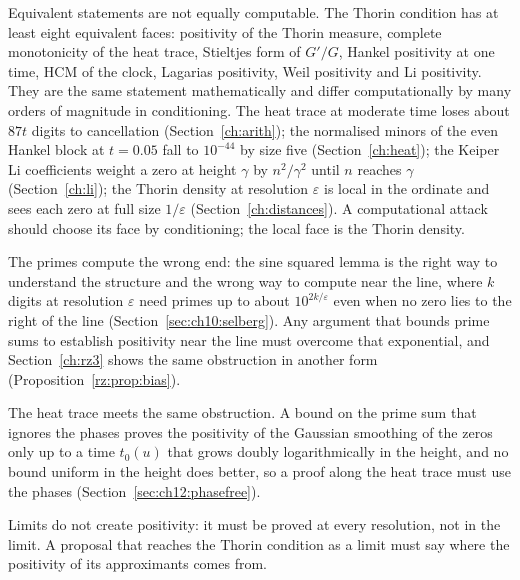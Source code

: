 Equivalent statements are not equally computable. The Thorin condition has at least eight equivalent faces: positivity of the Thorin measure, complete monotonicity of the heat trace, Stieltjes form of $G'/G$, Hankel positivity at one time, HCM of the clock, Lagarias positivity, Weil positivity and Li positivity. They are the same statement mathematically and differ computationally by many orders of magnitude in conditioning. The heat trace at moderate time loses about $87t$ digits to cancellation (Section~\ref{ch:arith}); the normalised minors of the even Hankel block at $t=0.05$ fall to $10^{-44}$ by size five (Section~\ref{ch:heat}); the Keiper Li coefficients weight a zero at height $\gamma$ by $n^2/\gamma^2$ until $n$ reaches $\gamma$ (Section~\ref{ch:li}); the Thorin density at resolution $\varepsilon$ is local in the ordinate and sees each zero at full size $1/\varepsilon$ (Section~\ref{ch:distances}). A computational attack should choose its face by conditioning; the local face is the Thorin density.

The primes compute the wrong end: the sine squared lemma is the right way to understand the structure and the wrong way to compute near the line, where $k$ digits at resolution $\varepsilon$ need primes up to about $10^{2k/\varepsilon}$ even when no zero lies to the right of the line (Section~\ref{sec:ch10:selberg}). Any argument that bounds prime sums to establish positivity near the line must overcome that exponential, and Section~\ref{ch:rz3} shows the same obstruction in another form (Proposition~\ref{rz:prop:bias}).

The heat trace meets the same obstruction. A bound on the prime sum that ignores the phases proves the positivity of the Gaussian smoothing of the zeros only up to a time $t_0(u)$ that grows doubly logarithmically in the height, and no bound uniform in the height does better, so a proof along the heat trace must use the phases (Section~\ref{sec:ch12:phasefree}).

Limits do not create positivity: it must be proved at every resolution, not in the limit. A proposal that reaches the Thorin condition as a limit must say where the positivity of its approximants comes from.

